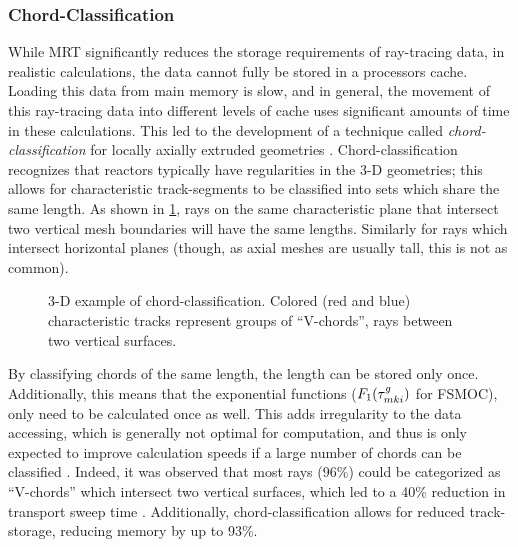 {{{        \subsubsection{Chord-Classification}{\label{sssec:RT:Chord-Classification}
          While \ac{MRT} significantly reduces the storage requirements of ray-tracing data, in realistic calculations, the data cannot fully be stored in a processors cache.
          Loading this data from main memory is slow, and in general, the movement of this ray-tracing data into different levels of cache uses significant amounts of time in these calculations.
          This led to the development of a technique called \emph{chord-classification} for locally axially extruded geometries \cite{Sciannandrone2016}.
          Chord-classification recognizes that reactors typically have regularities in the 3-D geometries; this allows for characteristic track-segments to be classified into sets which share the same length.
          As shown in \cref{fig:RT:Chord-Classification}, rays on the same characteristic plane that intersect two vertical mesh boundaries will have the same lengths.
          Similarly for rays which intersect horizontal planes (though, as axial meshes are usually tall, this is not as common).

          \begin{figure}[h]
            \centering
            \def\svgwidth{0.45\linewidth}
            
            \caption{3-D example of chord-classification. Colored (red and blue) characteristic tracks represent groups of ``V-chords'', rays between two vertical surfaces.}
            \label{fig:RT:Chord-Classification}
          \end{figure}

          By classifying chords of the same length, the length can be stored only once.
          Additionally, this means that the exponential functions ($F_1(\segopt)$ for \ac{FSMOC}), only need to be calculated once as well.
          This adds irregularity to the data accessing, which is generally not optimal for computation, and thus is only expected to improve calculation speeds if a large number of chords can be classified \cite{Sciannandrone2016}.
          Indeed, it was observed that most rays (96\%) could be categorized as ``V-chords'' which intersect two vertical surfaces, which led to a 40\% reduction in transport sweep time \cite{Sciannandrone2016}.
          Additionally, chord-classification allows for reduced track-storage, reducing memory by up to 93\%.
        }

}}}
